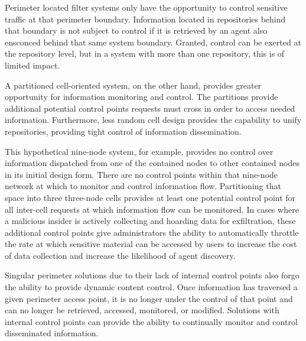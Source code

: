 Perimeter located filter systems only have the opportunity to control sensitive traffic at that perimeter boundary.  Information located in repositories behind that boundary is not subject to control if it is retrieved by an agent also ensconced behind that same system boundary.  Granted, control can be exerted at the repository level, but in a system with more than one repository, this is of limited impact.

A partitioned cell-oriented system, on the other hand, provides greater opportunity for information monitoring and control.  The partitions provide additional potential control points requests must cross in order to access needed information.  Furthermore, less random cell design provides the capability to unify repositories, providing tight control of information dissemination.

This hypothetical nine-node system, for example, provides no control over information dispatched from one of the contained nodes to other contained nodes in its initial design form.  There are no control points within that nine-node network at which to monitor and control information flow.  Partitioning that space into three three-node cells provides at least one potential control point for all inter-cell requests at which information flow can be monitored.  In cases where a malicious insider is actively collecting and hoarding data for exfiltration, these additional control points give administrators the ability to automatically throttle the rate at which sensitive material can be accessed by users to increase the cost of data collection and increase the likelihood of agent discovery.

Singular perimeter solutions due to their lack of internal control points also forgo the ability to provide dynamic content control.  Once information has traversed a given perimeter access point, it is no longer under the control of that point and can no longer be retrieved, accessed, monitored, or modified.  Solutions with internal control points can provide the ability to continually monitor and control disseminated information.

